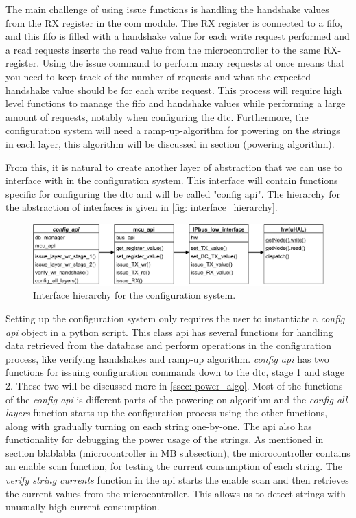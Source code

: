 \documentclass[main.tex]{subfiles}
\begin{document}
The main challenge of using issue functions is handling the handshake values from the RX register in the com module. The RX register is connected to a \gls{fifo}, and this \gls{fifo} is filled with a handshake value for each write request performed and a read requests inserts the read value from the microcontroller to the same RX-register. Using the issue command to perform many requests at once means that you need to keep track of the number of requests and what the expected handshake value should be for each write request. This process will require high level functions to manage the \gls{fifo} and handshake values while performing a large amount of requests, notably when configuring the \gls{dtc}. Furthermore, the configuration system will need a ramp-up-algorithm for powering on the strings in each layer, this algorithm will be discussed in section (powering algorithm).

From this, it is natural to create another layer of abstraction that we can use to interface with in the configuration system. This interface will contain functions specific for configuring the \gls{dtc} and will be called "config api". The hierarchy for the abstraction of interfaces is given in \autoref{fig: interface_hierarchy}.



\begin{figure}[!ht]
    \centering
    \includegraphics[width=17cm, scale=4]{images/interface_hierarchy.pdf}
    \caption{Interface hierarchy for the configuration system.}
    \label{fig: interface_hierarchy}
\end{figure}
\FloatBarrier

Setting up the configuration system only requires the user to instantiate a \textit{config api} object in a python script. This class \gls{api} has several functions for handling data retrieved from the database and perform operations in the configuration process, like verifying handshakes and ramp-up algorithm. \textit{config api} has two functions for issuing configuration commands down to the \gls{dtc}, stage 1 and stage 2. These two will be discussed more in \autoref{ssec: power_algo}. Most of the functions of the \textit{config api} is different parts of the powering-on algorithm and the \textit{config all layers}-function starts up the configuration process using the other functions, along with gradually turning on each string one-by-one. The \gls{api} also has functionality for debugging the power usage of the strings. As mentioned in section blablabla (microcontroller in MB subsection), the microcontroller contains an enable scan function, for testing the current consumption of each string. The \textit{verify string currents} function in the \gls{api} starts the enable scan and then retrieves the current values from the microcontroller. This allows us to detect strings with unusually high current consumption.
\end{document}
